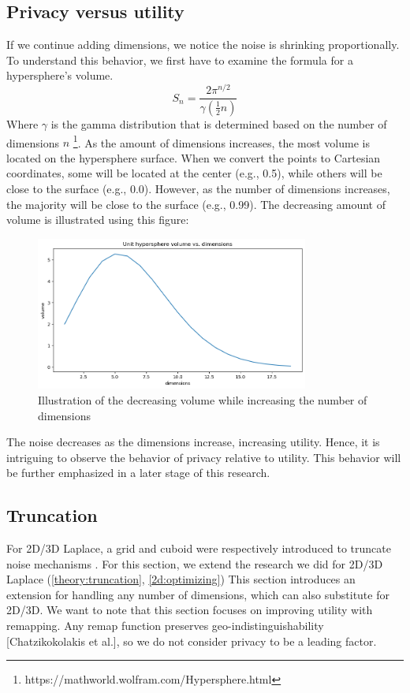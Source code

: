 \subsection{Privacy versus utility} \label{theory:privacy-utility-nd}
If we continue adding dimensions, we notice the noise is shrinking proportionally.
To understand this behavior, we first have to examine the formula for a hypersphere’s volume.
\begin{equation}
  S_n = \frac{2 \pi^{n/2}}{\gamma(\frac{1}{2}n)}
\end{equation}
Where $\gamma$ is the gamma distribution that is determined based on the number of dimensions $n$ \footnote{https://mathworld.wolfram.com/Hypersphere.html}.
As the amount of dimensions increases, the most volume is located on the hypersphere surface.
When we convert the points to Cartesian coordinates, some will be located at the center (e.g., 0.5), while others will be close to the surface (e.g., 0.0).
However, as the number of dimensions increases, the majority will be close to the surface (e.g., 0.99).
The decreasing amount of volume is illustrated using this figure:
\begin{figure}[H]
  \includegraphics[width=0.8\textwidth]{TheorethicalFramework/ND-Laplace/Images/volume.png}
  \caption{Illustration of the decreasing volume while increasing the number of dimensions}
  \label{fig:curse-of-dimensionality}
\end{figure}

The noise decreases as the dimensions increase, increasing utility.
Hence, it is intriguing to observe the behavior of privacy relative to utility.
This behavior will be further emphasized in a later stage of this research.
\newpage
\subsection{Truncation}
For 2D/3D Laplace, a grid and cuboid were respectively introduced to truncate noise mechanisms \citep{DBLP:journals/corr/abs-1212-1984,9646489}.
For this section, we extend the research we did for 2D/3D Laplace (\ref{theory:truncation}, \ref{2d:optimizing}) \newline
This section introduces an extension for handling any number of dimensions, which can also substitute for 2D/3D.
We want to note that this section focuses on improving utility with remapping.
Any remap function preserves geo-indistinguishability [Chatzikokolakis et al.], so we do not consider privacy to be a leading factor.

